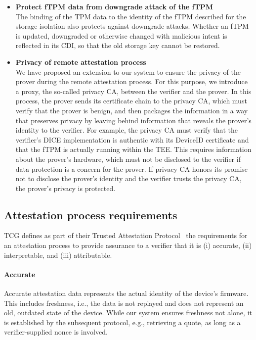 \begin{itemize}
    \item{\textbf{Protect fTPM data from downgrade attack of the fTPM}\\
    The binding of the TPM data to the identity of the fTPM described for the storage isolation also protects against downgrade attacks.
    Whether an fTPM is updated, downgraded or otherwise changed with malicious intent is reflected in its CDI, so that the old storage key cannot be restored.
    }

    \item{\textbf{Privacy of remote attestation process}\\
    We have proposed an extension to our system to ensure the privacy of the prover during the remote attestation process.
    For this purpose, we introduce a proxy, the so-called privacy CA, between the verifier and the prover.
    In this process, the prover sends its certificate chain to the privacy CA, which must verify that the prover is benign, and then packages the information in a way that preserves privacy by leaving behind information that reveals the prover's identity to the verifier.
    For example, the privacy CA must verify that the verifier's DICE implementation is authentic with its DeviceID certificate and that the fTPM is actually running within the TEE\@.
    This requires information about the prover's hardware, which must not be disclosed to the verifier if data protection is a concern for the prover.
    If privacy CA honors its promise not to disclose the prover's identity and the verifier trusts the privacy CA, the prover's privacy is protected.
    }
\end{itemize}

\subsection{Attestation process requirements}


\ac{TCG} defines as part of their Trusted Attestation Protocol~\cite{tap} the requirements for an attestation process to provide assurance to a verifier that it is (i) accurate, (ii) interpretable, and (iii) attributable.

\paragraph{Accurate}
Accurate attestation data represents the actual identity of the device's firmware.
This includes freshness, i.e., the data is not replayed and does not represent an old, outdated state of the device.
While our system ensures freshness not alone, it is established by the subsequent protocol, e.g., retrieving a quote, as long as a verifier-supplied nonce is involved.

